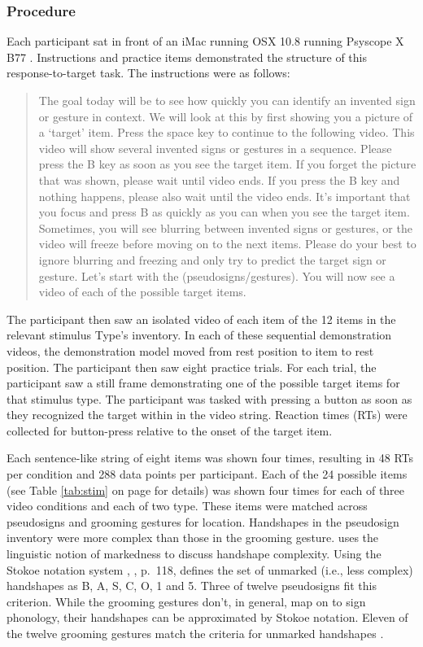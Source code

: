         \subsubsection{Procedure}
            Each participant sat in front of an iMac running OSX 10.8 running Psyscope X B77 \cite{psyscope}. Instructions and practice items demonstrated the structure of this response-to-target task. The instructions were as follows: \par
            \begin{quote}The goal today will be to see how quickly you can identify an invented sign or gesture in context. We will look at this by first showing you a picture of a ‘target’ item. Press the space key to continue to the following video. This video will show several invented signs or gestures in a sequence. Please press the B key as soon as you see the target item. If you forget the picture that was shown, please wait until video ends. If you press the B key and nothing happens, please also wait until the video ends. It's important that you focus and press B as quickly as you can when you see the target item. Sometimes, you will see blurring between invented signs or gestures, or the video will freeze before moving on to the next items. Please do your best to ignore blurring and freezing and only try to predict the target sign or gesture. Let's start with the (pseudosigns/gestures). You will now see a video of each of the possible target items. \end{quote}
            The participant then saw an isolated video of each item of the 12 items in the relevant stimulus Type’s inventory. In each of these sequential demonstration videos, the demonstration model moved from rest position to item to rest position. The participant then saw eight practice trials. For each trial, the participant saw a still frame demonstrating one of the possible target items for that stimulus type. The participant was tasked with pressing a button as soon as they recognized the target within in the video string. Reaction times (RTs) were collected for button-press relative to the onset of the target item. \par
            Each sentence-like string of eight items was shown four times, resulting in 48 RTs per condition and 288 data points per participant. Each of the 24 possible items (see Table \ref{tab:stim} on page \pageref{tab:stim} for details) was shown four times for each of three video conditions and each of two type. \label{par:hs_complexity} These items were matched across pseudosigns and grooming gestures for location. Handshapes in the pseudosign inventory were more complex than those in the grooming gesture.  uses the linguistic notion of markedness to discuss handshape complexity. Using the Stokoe notation system \cite{stokoe2005}, , p.~118, defines the set of unmarked (i.e., less complex) handshapes as B, A, S, C, O, 1 and 5. Three of twelve pseudosigns fit this criterion. While the grooming gestures don’t, in general, map on to sign phonology, their handshapes can be approximated by Stokoe notation. Eleven of the twelve grooming gestures match the criteria for unmarked handshapes \cite{brentari1998}. \par
